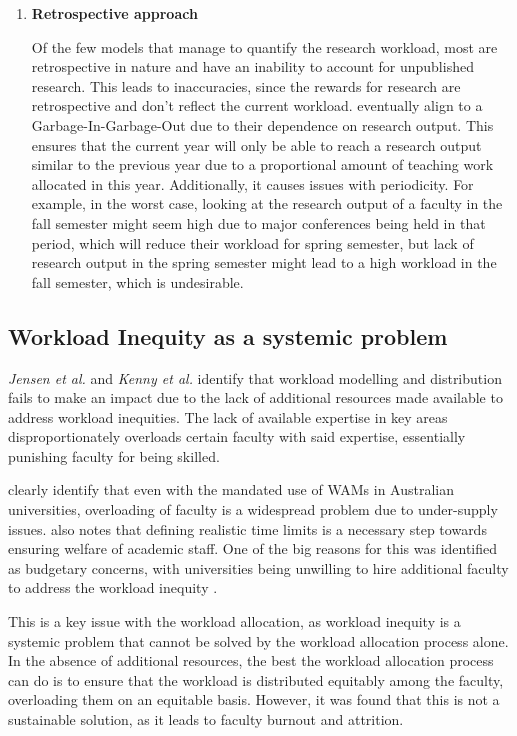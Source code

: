 \begin{enumerate}
  \item \textbf{Retrospective approach}

        Of the few models that manage to quantify the research workload, most are retrospective in nature and have an inability to account for unpublished research. This leads to inaccuracies, since the rewards for research are retrospective and don't reflect the current workload. eventually align to a Garbage-In-Garbage-Out due to their dependence on research output. This ensures that the current year will only be able to reach a research output similar to the previous year due to a proportional amount of teaching work allocated in this year. Additionally, it causes issues with periodicity. For example, in the worst case, looking at the research output of a faculty in the fall semester might seem high due to major conferences being held in that period, which will reduce their workload for spring semester, but lack of research output in the spring semester might lead to a high workload in the fall semester, which is undesirable.

\end{enumerate}

\subsection{Workload Inequity as a systemic problem}

\textit{Jensen et al.} \cite{jensen2009overload} and \textit{Kenny et al.} \cite{jensen2009overload, kenny2014effectiveness} identify that workload modelling and distribution fails to make an impact due to the lack of additional resources made available to address workload inequities. The lack of available expertise in key areas disproportionately overloads certain faculty with said expertise, essentially punishing faculty for being skilled.

\cite{vardi2009impacts, houston2006academic} clearly identify that even with the mandated use of WAMs in Australian universities, overloading of faculty is a widespread problem due to under-supply issues.\cite{kenny2014effectiveness} also notes that defining realistic time limits is a necessary step towards ensuring welfare of academic staff. One of the big reasons for this was identified as budgetary concerns, with universities being unwilling to hire additional faculty to address the workload inequity \cite{kenny2012placing}.

This is a key issue with the workload allocation, as workload inequity is a systemic problem that cannot be solved by the workload allocation process alone. In the absence of additional resources, the best the workload allocation process can do is to ensure that the workload is distributed equitably among the faculty, overloading them on an equitable basis. However, it was found that this is not a sustainable solution, as it leads to faculty burnout and attrition.

